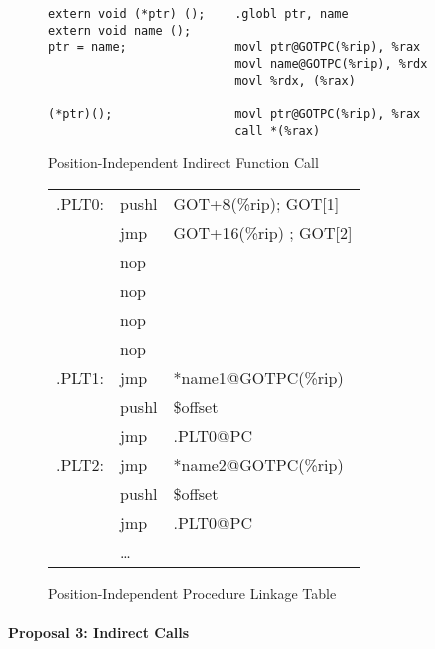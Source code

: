 \begin{figure}[H]
\caption{Position-Independent Indirect Function Call}
\begin{verbatim}
extern void (*ptr) ();    .globl ptr, name
extern void name ();
ptr = name;               movl ptr@GOTPC(%rip), %rax
                          movl name@GOTPC(%rip), %rdx
                          movl %rdx, (%rax)

(*ptr)();                 movl ptr@GOTPC(%rip), %rax
                          call *(%rax)
\end{verbatim}
\end{figure}

\begin{figure}[H]
\caption{Position-Independent Procedure Linkage Table}
\begin{tabular}{lll}
.PLT0: & pushl & GOT+8(\%rip); GOT[1]\\
& jmp &GOT+16(\%rip) ; GOT[2] \\
& nop & \\
& nop & \\
& nop & \\
& nop & \\
.PLT1: & jmp &*name1@GOTPC(\%rip)\\
& pushl & \$offset \\
&jmp &.PLT0@PC \\
.PLT2: & jmp&*name2@GOTPC(\%rip)\\
&pushl & \$offset \\
& jmp & .PLT0@PC \\
&\dots\\
\end{tabular}
\end{figure}


\paragraph{Proposal 3: Indirect Calls}



